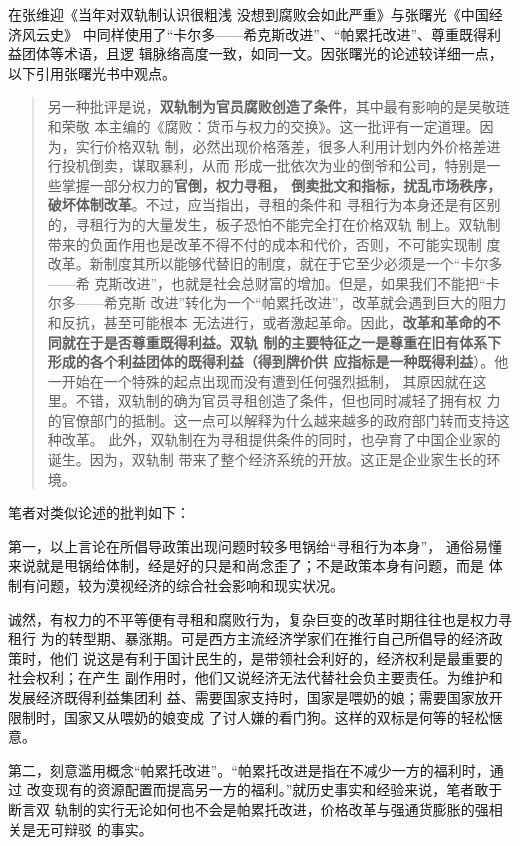在张维迎《当年对双轨制认识很粗浅 没想到腐败会如此严重》与张曙光《中国经济风云史》
中同样使用了“卡尔多——希克斯改进”、“帕累托改进”、尊重既得利益团体等术语，且逻
辑脉络高度一致，如同一文。因张曙光的论述较详细一点，以下引用张曙光书中观点。
\begin{quotation}
  另一种批评是说，\textbf{双轨制为官员腐败创造了条件}，其中最有影响的是吴敬琏和荣敬
  本主编的《腐败：货币与权力的交换》。这一批评有一定道理。因为，实行价格双轨
  制，必然出现价格落差，很多人利用计划内外价格差进行投机倒卖，谋取暴利，从而
  形成一批依次为业的倒爷和公司，特别是一些掌握一部分权力的\textbf{官倒，权力寻租，
    倒卖批文和指标，扰乱市场秩序，破坏体制改革}。不过，应当指出，寻租的条件和
  寻租行为本身还是有区别的，寻租行为的大量发生，板子恐怕不能完全打在价格双轨
  制上。双轨制带来的负面作用也是改革不得不付的成本和代价，否则，不可能实现制
  度改革。新制度其所以能够代替旧的制度，就在于它至少必须是一个“卡尔多——希
  克斯改进”，也就是社会总财富的增加。但是，如果我们不能把“卡尔多——希克斯
  改进”转化为一个“帕累托改进”，改革就会遇到巨大的阻力和反抗，甚至可能根本
  无法进行，或者激起革命。因此，\textbf{改革和革命的不同就在于是否尊重既得利益。双轨
  制的主要特征之一是尊重在旧有体系下形成的各个利益团体的既得利益（得到牌价供
  应指标是一种既得利益}）。他一开始在一个特殊的起点出现而没有遭到任何强烈抵制，
  其原因就在这里。不错，双轨制的确为官员寻租创造了条件，但也同时减轻了拥有权
  力的官僚部门的抵制。这一点可以解释为什么越来越多的政府部门转而支持这种改革。
  此外，双轨制在为寻租提供条件的同时，也孕育了中国企业家的诞生。因为，双轨制
  带来了整个经济系统的开放。这正是企业家生长的环
  境。
\end{quotation}

笔者对类似论述的批判如下：

第一，以上言论在所倡导政策出现问题时较多甩锅给“寻租行为本身”，
通俗易懂来说就是甩锅给体制，经是好的只是和尚念歪了；不是政策本身有问题，而是
体制有问题，较为漠视经济的综合社会影响和现实状况。

诚然，有权力的不平等便有寻租和腐败行为，复杂巨变的改革时期往往也是权力寻租行
为的转型期、暴涨期。可是西方主流经济学家们在推行自己所倡导的经济政策时，他们
说这是有利于国计民生的，是带领社会利好的，经济权利是最重要的社会权利；在产生
副作用时，他们又说经济无法代替社会负主要责任。为维护和发展经济既得利益集团利
益、需要国家支持时，国家是喂奶的娘；需要国家放开限制时，国家又从喂奶的娘变成
了讨人嫌的看门狗。这样的双标是何等的轻松惬意。

第二，刻意滥用概念“帕累托改进”。“帕累托改进是指在不减少一方的福利时，通过
改变现有的资源配置而提高另一方的福利。”就历史事实和经验来说，笔者敢于断言双
轨制的实行无论如何也不会是帕累托改进，价格改革与强通货膨胀的强相关是无可辩驳
的事实。

